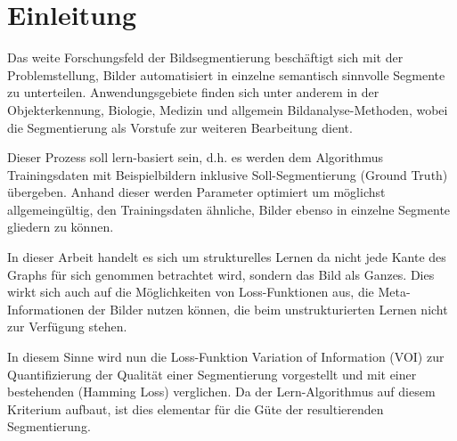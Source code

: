 \chapter{Einleitung}\label{ch:introduction}

Das weite Forschungsfeld der Bildsegmentierung beschäftigt sich mit der Problemstellung, Bilder automatisiert in einzelne semantisch sinnvolle Segmente zu unterteilen. Anwendungsgebiete finden sich unter anderem in der Objekterkennung, Biologie, Medizin und allgemein Bildanalyse-Methoden, wobei die Segmentierung als Vorstufe zur weiteren Bearbeitung dient. \\





\begin{figure}[H]
	\centering
	\hfill
\end{figure}
\vspace{-0.5cm}

\vspace{0.8cm}


Dieser Prozess soll lern-basiert sein, d.h. es werden dem Algorithmus Trainingsdaten mit Beispielbildern inklusive Soll-Segmentierung (Ground Truth) übergeben. Anhand dieser werden Parameter optimiert um möglichst allgemeingültig, den Trainingsdaten ähnliche, Bilder ebenso in einzelne Segmente gliedern zu können.

In dieser Arbeit handelt es sich um strukturelles Lernen da nicht jede Kante des Graphs für sich genommen betrachtet wird, sondern das Bild als Ganzes. Dies wirkt sich auch auf die Möglichkeiten von Loss-Funktionen aus, die Meta-Informationen der Bilder nutzen können, die beim unstrukturierten Lernen nicht zur Verfügung stehen.

In diesem Sinne wird nun die Loss-Funktion Variation of Information (VOI) zur Quantifizierung der Qualität einer Segmentierung vorgestellt und mit einer bestehenden (Hamming Loss) verglichen. Da der Lern-Algorithmus auf diesem Kriterium aufbaut, ist dies elementar für die Güte der resultierenden Segmentierung.

\newpage

